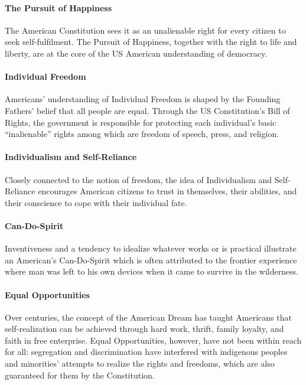 \documentclass[10pt]{article}
\begin{document}
\paragraph{The Pursuit of Happiness}
The American Constitution sees it as an unalienable right for every citizen to seek
self-fulfilment. The Pursuit of Happiness, together with the right to life and liberty, are at the core of the
US American understanding of democracy.

\paragraph{Individual Freedom}
Americans' understanding of Individual Freedom is shaped by the Founding Fathers' belief that all
people are equal. Through the US Constitution's Bill of Rights, the government is
responsible for protecting each individual's basic \enquote{inalienable} rights among
which are freedom of speech, press, and religion.

\paragraph{Individualism and Self-Reliance}
Closely connected to the notion of freedom, the idea of Individualism and Self-Reliance encourages American
citizens to trust in themselves, their abilities, and their conscience to cope with
their individual fate.

\paragraph{Can-Do-Spirit}
Inventiveness and a tendency to idealize whatever works or is practical illustrate
an American's Can-Do-Spirit which is often attributed to the frontier experience where man
was left to his own devices when it came to survive in the wilderness.

\paragraph{Equal Opportunities}
Over centuries, the concept of the American Dream has taught Americans that
self-realization can be achieved through hard work, thrift, family loyalty, and faith
in free enterprise. Equal Opportunities, however, have not been within reach for all: segregation and
discrimination have interfered with indigenous peoples and minorities' attempts
to realize the rights and freedoms, which are also guaranteed for them by the
Constitution.
\end{document}
